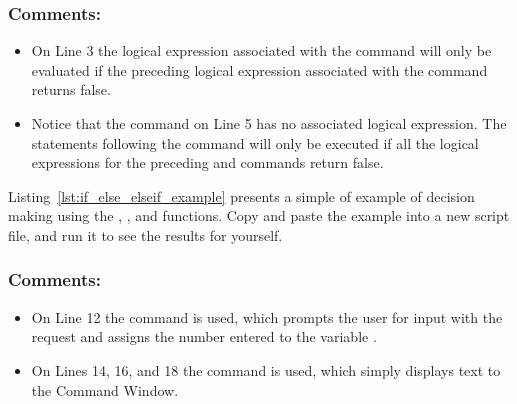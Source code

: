\subsubsection{Comments:}
\begin{itemize}
\item On Line 3 the logical expression associated with the  command will only be evaluated if the preceding logical expression associated with the  command returns false.
\item Notice that the  command on Line 5 has no associated logical expression. The statements following the  command will only be executed if all the logical expressions for the preceding  and  commands return false.
\end{itemize}
Listing~\ref{lst:if_else_elseif_example} presents a simple of example of decision making using the , , and  functions. Copy and paste the example into a new script file, and run it to see the results for yourself.



\subsubsection{Comments:}
\begin{itemize}
\item On Line 12 the  command is used, which prompts the user for input with the request  and assigns the number entered to the variable .
\item On Lines 14, 16, and 18 the  command is used, which simply displays text to the Command Window.
\end{itemize}

